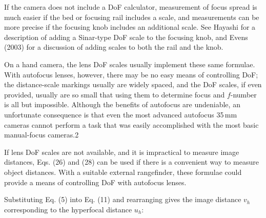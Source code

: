 \documentclass[11pt, oneside]{scrartcl}   	%
\begin{document}
If the camera does not include a DoF calculator, measurement of focus spread is much easier if the bed or focusing rail includes a scale, and measurements can be more precise if the focusing knob includes an additional scale. See Hayashi for a description of adding a Sinar-type DoF scale to the focusing knob, and Evens (2003) for a discussion of adding scales to both the rail and the knob.

On a hand camera, the lens DoF scales usually implement these same formulae. With autofocus lenses, however, there may be no easy means of controlling DoF; the distance-scale markings usually are widely spaced, and the DoF scales, if even provided, usually are so small that using them to determine focus and $f$-number is all but impossible. Although the benefits of autofocus are undeniable, an unfortunate consequence is that even the most advanced autofocus 35\,mm cameras cannot perform a task that was easily accomplished with the most basic manual-focus cameras.2

If lens DoF scales are not available, and it is impractical to measure image distances, Eqs. (26) and (28) can be used if there is a convenient way to measure object distances. With a suitable external rangefinder, these formulae could provide a means of controlling DoF with autofocus lenses.

Substituting Eq. (5) into Eq. (11) and rearranging gives the image distance $v_h$ corresponding to the hyperfocal distance $u_h$:

\end{document}
